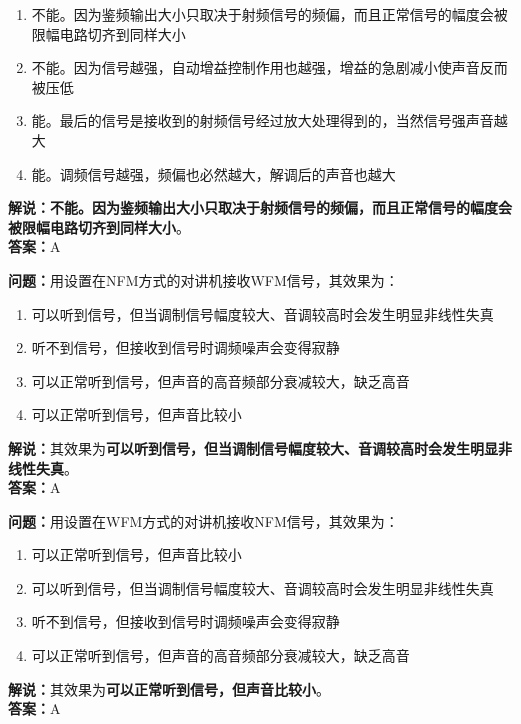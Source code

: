 \begin{enumerate}[label=\Alph*), leftmargin=1cm]
	\item 不能。因为鉴频输出大小只取决于射频信号的频偏，而且正常信号的幅度会被限幅电路切齐到同样大小
	\item 不能。因为信号越强，自动增益控制作用也越强，增益的急剧减小使声音反而被压低
	\item 能。最后的信号是接收到的射频信号经过放大处理得到的，当然信号强声音越大
	\item 能。调频信号越强，频偏也必然越大，解调后的声音也越大
\end{enumerate}

\textbf{解说：不能。因为鉴频输出大小只取决于射频信号的频偏，而且正常信号的幅度会被限幅电路切齐到同样大小}。\\\textbf{答案：}A%



\textbf{问题：}用设置在NFM方式的对讲机接收WFM信号，其效果为：

\begin{enumerate}[label=\Alph*), leftmargin=1cm]
	\item 可以听到信号，但当调制信号幅度较大、音调较高时会发生明显非线性失真
	\item 听不到信号，但接收到信号时调频噪声会变得寂静
	\item 可以正常听到信号，但声音的高音频部分衰减较大，缺乏高音
	\item 可以正常听到信号，但声音比较小
\end{enumerate}

\textbf{解说：}其效果为\textbf{可以听到信号，但当调制信号幅度较大、音调较高时会发生明显非线性失真}。\\\textbf{答案：}A%

\textbf{问题：}用设置在WFM方式的对讲机接收NFM信号，其效果为：

\begin{enumerate}[label=\Alph*), leftmargin=1cm]
	\item 可以正常听到信号，但声音比较小
	\item 可以听到信号，但当调制信号幅度较大、音调较高时会发生明显非线性失真
	\item 听不到信号，但接收到信号时调频噪声会变得寂静
	\item 可以正常听到信号，但声音的高音频部分衰减较大，缺乏高音
\end{enumerate}

\textbf{解说：}其效果为\textbf{可以正常听到信号，但声音比较小}。\\\textbf{答案：}A%


